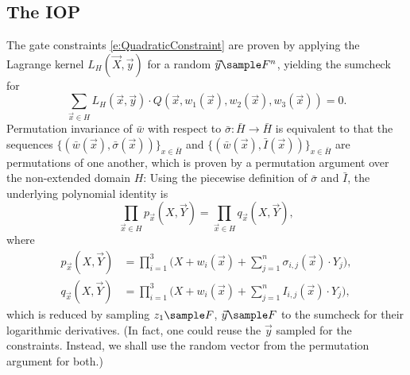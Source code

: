 \documentclass[11pt]{article}
\theoremstyle{definition}
\theoremstyle{remark}
\begin{document}
\subsection{The IOP}

The gate constraints \eqref{e:QuadraticConstraint} are proven by applying the Lagrange kernel $L_H(\vec X,\vec y)$ for a random $\vec y\sample F^n$, yielding the sumcheck for
\[
\sum_{\vec x\in H} L_H(\vec x, \vec y) \cdot Q(\vec x, w_1(\vec x), w_2(\vec x), w_3(\vec x)) = 0.
\]
Permutation invariance of $\bar w$ with respect to $\bar \sigma: \bar H\longrightarrow \bar H$ is equivalent to that the sequences $\{(\bar w(\vec x), \bar\sigma(\vec x))\}_{x\in \bar H}$ and $\{(\bar w(\vec x), \bar I(\vec x))\}_{x\in\bar H}$
 are permutations of one another, which is proven by a permutation argument over the non-extended domain $H$: 
Using the piecewise definition of $\bar\sigma$ and $\bar I$, the underlying polynomial identity is
\begin{equation}
\label{e:PermutationInvarianceIdentity}
\prod_{\vec x\in H} p_{\vec x}(X, \vec Y)= \prod_{\vec x\in H}  q_{\vec x}(X, \vec Y),
\end{equation}
where
\begin{align}
\label{e:FactorSigma}
p_{\vec x}(X, \vec Y) &=  \prod_{i=1}^3\Big(X + w_i(\vec x) + \sum_{j=1}^n \sigma_{i,j}(\vec x)\cdot Y_j\Big), 
\\
\label{e:FactorId}
q_{\vec x}(X, \vec Y) &= \prod_{i=1}^3 \Big(X + w_i(\vec x) +  \sum_{j=1}^n I_{i,j}(\vec x)\cdot Y_j\Big),
\end{align}
which is reduced by sampling $z_1\sample F$, $\vec y\sample F$ to the sumcheck for their logarithmic derivatives. 
(In fact, one could reuse the $\vec y$ sampled for the constraints. 
Instead, we shall use the random vector from the permutation argument for both.)
\end{document}
